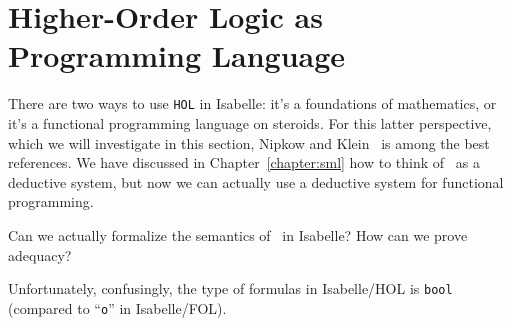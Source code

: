 \section{Higher-Order Logic as Programming Language}

\begin{node}\label{isabelle:hol-0000}%
There are two ways to use \texttt{HOL} in Isabelle: it's a foundations
of mathematics, or it's a functional programming language on steroids.
For this latter perspective, which we will investigate in this section,
Nipkow and Klein~\cite{Nipkow2014concrete} is among the best references.
We have discussed in Chapter~\ref{chapter:sml} how to think of \SML\ as
a deductive system, but now we can actually use a deductive system for
functional programming.
\end{node}

\begin{puzzle}\label{isabelle:hol-0002}%
Can we actually formalize the semantics of \SML\ in Isabelle? How can we
prove adequacy?
\end{puzzle}

\begin{node}\label{isabelle:hol-0001}%
Unfortunately, confusingly, the type of formulas in Isabelle/HOL is
\texttt{bool} (compared to ``\texttt{o}'' in Isabelle/FOL).
\end{node}

